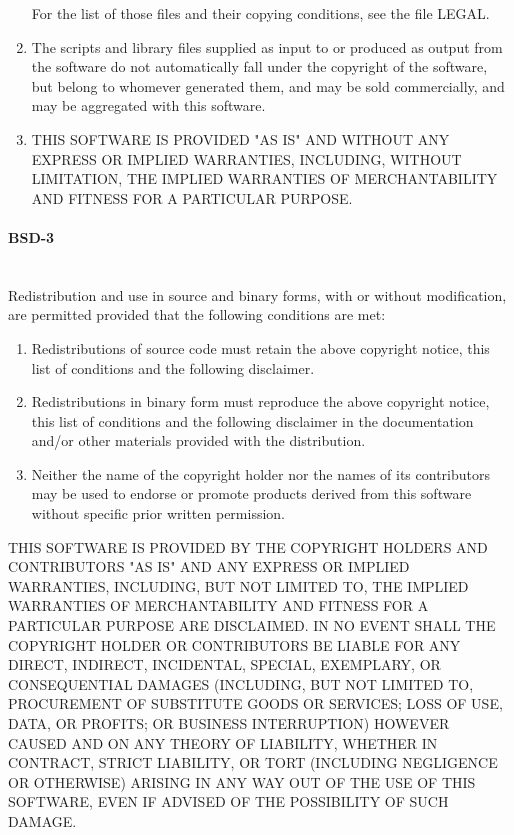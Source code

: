 \documentclass[11pt,a4paper, twoside]{article}
\begin{document}
\begin{enumerate}
     For the list of those files and their copying conditions, see the
     file LEGAL.
\item The scripts and library files supplied as input to or produced as 
     output from the software do not automatically fall under the
     copyright of the software, but belong to whomever generated them, 
     and may be sold commercially, and may be aggregated with this
     software.
\item THIS SOFTWARE IS PROVIDED "AS IS" AND WITHOUT ANY EXPRESS OR
     IMPLIED WARRANTIES, INCLUDING, WITHOUT LIMITATION, THE IMPLIED
     WARRANTIES OF MERCHANTABILITY AND FITNESS FOR A PARTICULAR
     PURPOSE.
\end{enumerate}
\paragraph{BSD-3} ~\\
\newline
Redistribution and use in source and binary forms, with or without modification, are permitted provided that the following conditions are met:
\begin{enumerate}

\item Redistributions of source code must retain the above copyright notice, this list of conditions and the following disclaimer.

\item Redistributions in binary form must reproduce the above copyright notice, this list of conditions and the following disclaimer in the documentation and/or other materials provided with the distribution.

\item Neither the name of the copyright holder nor the names of its contributors may be used to endorse or promote products derived from this software without specific prior written permission.

\end{enumerate}
THIS SOFTWARE IS PROVIDED BY THE COPYRIGHT HOLDERS AND CONTRIBUTORS "AS IS" AND ANY EXPRESS OR IMPLIED WARRANTIES, INCLUDING, BUT NOT LIMITED TO, THE IMPLIED WARRANTIES OF MERCHANTABILITY AND FITNESS FOR A PARTICULAR PURPOSE ARE DISCLAIMED. IN NO EVENT SHALL THE COPYRIGHT HOLDER OR CONTRIBUTORS BE LIABLE FOR ANY DIRECT, INDIRECT, INCIDENTAL, SPECIAL, EXEMPLARY, OR CONSEQUENTIAL DAMAGES (INCLUDING, BUT NOT LIMITED TO, PROCUREMENT OF SUBSTITUTE GOODS OR SERVICES; LOSS OF USE, DATA, OR PROFITS; OR BUSINESS INTERRUPTION) HOWEVER CAUSED AND ON ANY THEORY OF LIABILITY, WHETHER IN CONTRACT, STRICT LIABILITY, OR TORT (INCLUDING NEGLIGENCE OR OTHERWISE) ARISING IN ANY WAY OUT OF THE USE OF THIS SOFTWARE, EVEN IF ADVISED OF THE POSSIBILITY OF SUCH DAMAGE.
\end{document}
